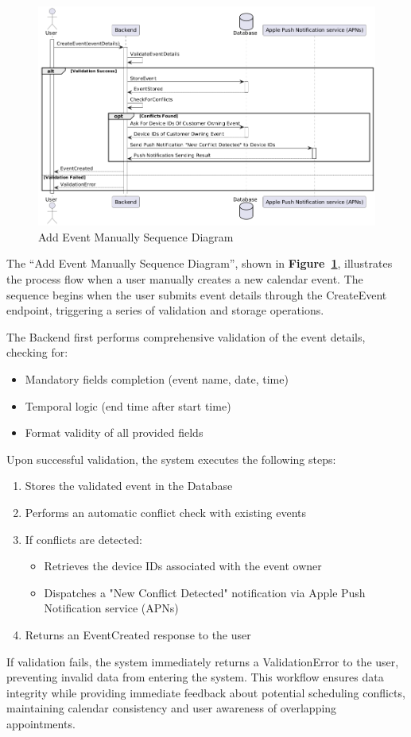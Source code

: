 \begin{figure}[!h]
  \centering
  \includegraphics[width=\textwidth]{images/docs/diagrams/sequence-diagrams/all-sequence-diagrams/Add Event Manually.png}
  \caption{Add Event Manually Sequence Diagram}
  \label{fig:seq/add-event-manually}
\end{figure}

The ``Add Event Manually Sequence Diagram'', shown in \textbf{Figure~\ref{fig:seq/add-event-manually}}, illustrates the process flow when a user manually creates a new calendar event. The sequence begins when the user submits event details through the CreateEvent endpoint, triggering a series of validation and storage operations.

The Backend first performs comprehensive validation of the event details, checking for:
\begin{itemize}
  \item Mandatory fields completion (event name, date, time)
  \item Temporal logic (end time after start time)
  \item Format validity of all provided fields
\end{itemize}

Upon successful validation, the system executes the following steps:
\begin{enumerate}
  \item Stores the validated event in the Database
  \item Performs an automatic conflict check with existing events
  \item If conflicts are detected:
        \begin{itemize}
          \item Retrieves the device IDs associated with the event owner
          \item Dispatches a "New Conflict Detected" notification via Apple Push Notification service (APNs)
        \end{itemize}
  \item Returns an EventCreated response to the user
\end{enumerate}

If validation fails, the system immediately returns a ValidationError to the user, preventing invalid data from entering the system. This workflow ensures data integrity while providing immediate feedback about potential scheduling conflicts, maintaining calendar consistency and user awareness of overlapping appointments.
